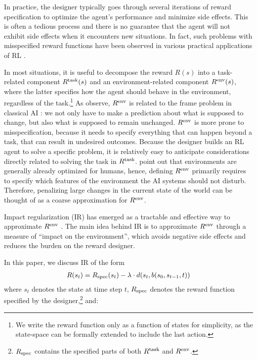 \documentclass[letterpaper]{article} %
\newcommand{\Rtask}{R^{\textnormal{task}}}
\newcommand{\Rframe}{R^{\textnormal{env}}}
\begin{document}
In practice, the designer typically goes through several iterations of reward specification to optimize the agent's performance and minimize side effects. This is often a tedious process and there is no guarantee that the agent will not exhibit side effects when it encounters new situations. In fact, such problems with misspecified reward functions have been observed in various practical applications of RL \citep{krakovnaspecification}.

In most situations, it is useful to decompose the reward $R(s)$ into a task-related component $\Rtask(s)$ and an environment-related component $\Rframe(s)$, where the latter specifies how the agent should behave in the environment, regardless of the task.\footnote{We write the reward function only as a function of states for simplicity, as the state-space can be formally extended to include the last action.} As \citet{Shah2018} observe, $\Rframe$ is related to the frame problem in classical AI \citep{mccarthy1969some}: we not only have to make a prediction about what is supposed to change, but also what is supposed to remain unchanged.
$\Rframe$ is more prone to misspecification, because it needs to specify everything that can happen beyond a task, that can result in undesired outcomes. Because the designer builds an RL agent to solve a specific problem, it is relatively easy to anticipate considerations directly related to solving the task in $\Rtask$.
\citet{Shah2018} point out that environments are generally already optimized for humans, hence, defining $\Rframe$ primarily requires to specify which features of the environment the AI systems should not disturb. Therefore, penalizing large changes in the current state of the world can be thought of as a coarse approximation for $\Rframe$.

Impact regularization (IR) has emerged as a tractable and effective way to approximate $\Rframe$ \citep{armstrong2017low, krakovna2018penalizing, turner2020conservative}. The main idea behind IR is to approximate $\Rframe$ through a measure of ``impact on the environment'', which avoids negative side effects and reduces the burden on the reward designer.

In this paper, we discuss IR of the form
\begin{align}
\label{eqn:regularization_abstract}
R(s_t) = R_{\textnormal{spec}}(s_t) -\lambda \cdot d(s_t, b(s_0, s_{t-1}, t))
\end{align}
where $s_t$ denotes the state at time step $t$, $R_{\textnormal{spec}}$ denotes the reward function specified by the designer,\footnote{$R_{\textnormal{spec}}$ contains the specified parts of both $\Rtask$ and $\Rframe$.} and:
\end{document}
